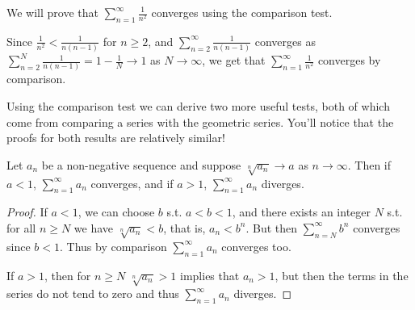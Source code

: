 \begin{example}
	We will prove that $\sum_{n = 1}^{\infty} \frac{1}{n^2}$ converges using the comparison test.

	Since $\frac{1}{n^2} < \frac{1}{n(n - 1)}$ for $n \geq 2$, and $\sum_{n = 2}^{\infty} \frac{1}{n(n - 1)}$ converges as
	$\sum_{n = 2}^N \frac{1}{n(n - 1)} = 1 - \frac{1}{N} \rightarrow 1$ as $N \rightarrow \infty$, we get that $\sum_{n = 1}^{\infty} \frac{1}{n^2}$ converges by comparison.
\end{example}

Using the comparison test we can derive two more useful tests, both of which come from comparing a series with the geometric series. You'll notice that the proofs for both results are relatively similar!

\begin{theorem}
	Let $a_n$ be a non-negative sequence and suppose $\sqrt[n]{a_n} \rightarrow a$ as $n \rightarrow \infty$.
	Then if $a < 1$, $\sum_{n = 1}^{\infty} a_n$ converges, and if $a > 1$, $\sum_{n = 1}^{\infty} a_n$ diverges.
\end{theorem}
\begin{proof}
	If $a < 1$, we can choose $b$ s.t. $a < b < 1$, and there exists an integer $N$ s.t. for all $n \geq N$ we have $\sqrt[n]{a_n} < b$, that is, $a_n < b^n$. But then $\sum_{n = N}^{\infty} b^n$ converges since $b < 1$. Thus by comparison $\sum_{n = 1}^{\infty} a_n$ converges too.

	If $a > 1$, then for $n \geq N$ $\sqrt[n]{a_n} > 1$ implies that $a_n > 1$, but then the terms in the series do not tend to zero and thus $\sum_{n = 1}^{\infty} a_n$ diverges.
\end{proof}


